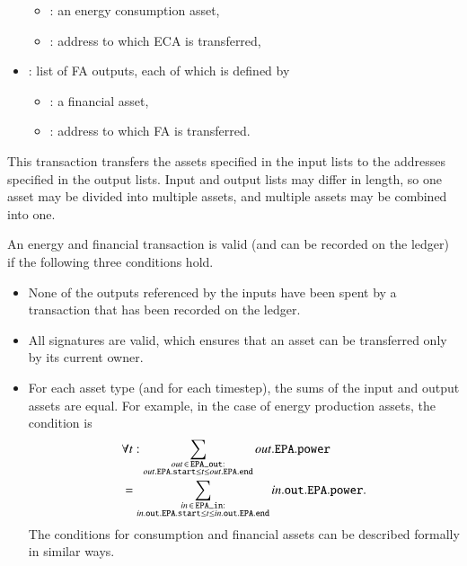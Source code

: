 \begin{itemize}[noitemsep,topsep=-\parskip]
\begin{itemize}[leftmargin=0.5em,nosep]
\item {}: an energy consumption asset,
\item {}: address to which ECA is transferred,
\end{itemize}
\item {}: list of FA outputs, each of which is defined by
\begin{itemize}[leftmargin=0.5em,nosep]
\item {}: a financial asset,
\item {}: address to which FA is transferred.
\end{itemize}
\end{itemize}
\vspace{0.5\parskip} This transaction transfers the assets specified
in the input lists to the addresses specified in the output lists.
Input and output lists may differ in length, so one asset may be
divided into multiple assets, and multiple assets may be combined into
one.

An energy and financial transaction is valid (and can be recorded on
the ledger) if the following three conditions hold.
\begin{itemize}[noitemsep,topsep=-\parskip]
\item None of the outputs referenced by the inputs have been spent by
  a transaction that has been recorded on the ledger.
\item All signatures are valid, which ensures that an asset can be
  transferred only by its current owner. 
\item For each asset type (and for each timestep), the sums of the
input and output assets are equal.  For example, in the case of
energy production assets, the condition is
\begin{align*}
& \forall t: \sum_{\substack{out \,\in\, \texttt{EPA\_out}:\\out.\texttt{EPA}.\texttt{start} \leq t \leq out.\texttt{EPA}.\texttt{end}}} out.\texttt{EPA}.\texttt{power} \nonumber \\
& = \sum_{\substack{in \,\in\, \texttt{EPA\_in}:\\in.\texttt{out}.\texttt{EPA}.\texttt{start} \leq t \leq in.\texttt{out}.\texttt{EPA}.\texttt{end}}} in.\texttt{out}.\texttt{EPA}.\texttt{power}  .
\end{align*}
The conditions for consumption and financial assets can be described
formally in similar ways.
\end{itemize}

